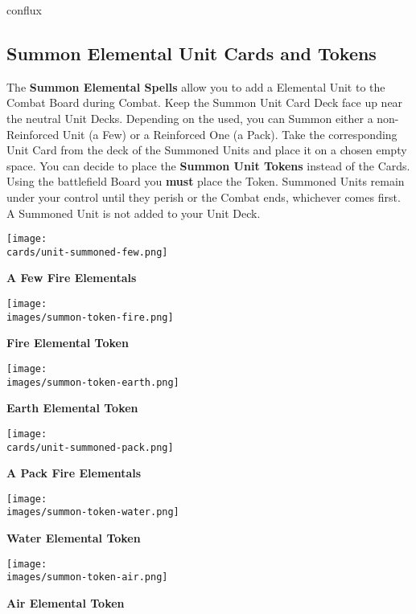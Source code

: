 \vspace*{1em}
\begin{expansion}{conflux}
    \begin{multicols}{2}
    \subsection*{Summon Elemental Unit Cards and Tokens}
    The \textbf{Summon Elemental Spells} allow you to add a Elemental Unit to the Combat Board during Combat.
    Keep the Summon Unit Card Deck face up near the neutral Unit Decks.
    Depending on the  used, you can Summon either a non-Reinforced Unit (a Few) or a Reinforced One (a Pack).
    Take the corresponding Unit Card from the deck of the Summoned Units and place it on a chosen empty space.
    You can decide to place the \textbf{Summon Unit Tokens} instead of the Cards.
    Using the battlefield Board you \textbf{must} place the Token.
    Summoned Units remain under your control until they perish or the Combat ends, whichever comes first.
    A Summoned Unit is not added to your Unit Deck.
    \columnbreak
        \begin{multicols}{2}
        \centering
        \texttt{[image: \\cards/unit-summoned-few.png]}\par
        \textbf{\scriptsize\color{darkcandyapplered}A Few Fire Elementals}\par
        \smallskip
        \texttt{[image: \\images/summon-token-fire.png]}\par
        \centering\textbf{\scriptsize\color{darkcandyapplered}Fire Elemental Token}\par
        \smallskip
        \texttt{[image: \\images/summon-token-earth.png]}\par
        \centering\textbf{\scriptsize\color{darkcandyapplered}Earth Elemental Token}\par

        \columnbreak
        \texttt{[image: \\cards/unit-summoned-pack.png]}\par
        \textbf{\scriptsize\color{darkcandyapplered}A Pack Fire Elementals\\}\par
        \smallskip
        \texttt{[image: \\images/summon-token-water.png]}\par
        \centering\textbf{\scriptsize\color{darkcandyapplered}Water Elemental Token\\}\par
        \smallskip
        \texttt{[image: \\images/summon-token-air.png]}\par
        \centering\textbf{\scriptsize\color{darkcandyapplered}Air Elemental Token}\par
        \end{multicols}
    \end{multicols}
\end{expansion}

